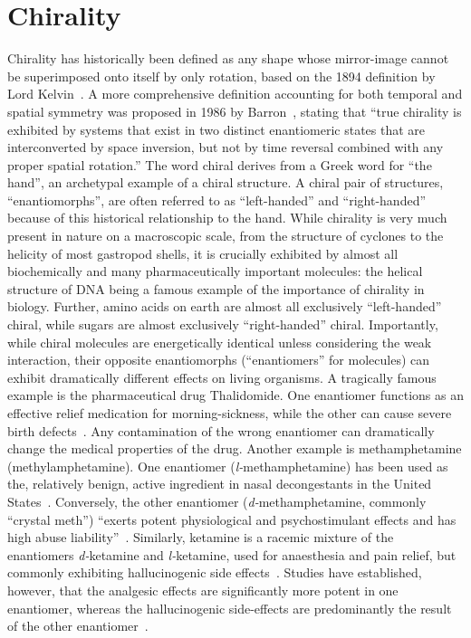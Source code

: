 \chapter{Chirality}\label{sec:background:Chirality}

Chirality has historically been defined as any shape whose mirror-image cannot be superimposed onto itself by only rotation, based on the 1894 definition by Lord Kelvin~\cite{Kelvin1894}. 
A more comprehensive definition accounting for both temporal and spatial symmetry was proposed in 1986 by Barron~\cite{Barron1986}, stating that ``true chirality is exhibited by systems that exist in two distinct enantiomeric states that are interconverted by space inversion, but not by time reversal combined with any proper spatial rotation.''
The word chiral derives from a Greek word for ``the hand'', an archetypal example of a chiral structure. A chiral pair of structures, ``enantiomorphs'', are often referred to as ``left-handed'' and ``right-handed'' because of this historical relationship to the hand. While chirality is very much present in nature on a macroscopic scale, from the structure of cyclones to the helicity of most gastropod shells, it is crucially exhibited by almost all biochemically and many pharmaceutically important molecules: the helical structure of DNA being a famous example of the importance of chirality in biology. Further, amino acids on earth are almost all exclusively ``left-handed'' chiral, while sugars are almost exclusively ``right-handed'' chiral. Importantly, while chiral molecules are energetically identical unless considering the weak interaction, their opposite enantiomorphs (``enantiomers'' for molecules) can exhibit dramatically different effects on living organisms. 
A tragically famous example is the pharmaceutical drug Thalidomide. One enantiomer functions as an effective relief medication for morning-sickness, while the other can cause severe birth defects~\cite{Vargesson2015}. Any contamination of the wrong enantiomer can dramatically change the medical properties of the drug.
Another example is methamphetamine (methylamphetamine). One enantiomer (\textit{l-}methamphetamine) has been used as the, relatively benign, active ingredient in nasal decongestants in the United States~\cite{Mendelson2008}. Conversely, the other enantiomer (\textit{d-}methamphetamine, commonly ``crystal meth'') ``exerts potent physiological and psychostimulant effects and has high abuse liability''~\cite{Nishimura2017}. 
Similarly, ketamine is a racemic mixture of the enantiomers \textit{d-}ketamine and \textit{l-}ketamine, used for anaesthesia and pain relief, but commonly exhibiting hallucinogenic side effects~\cite{Craven2007}. Studies have established, however, that the analgesic effects are significantly more potent in one enantiomer, whereas the hallucinogenic side-effects are predominantly the result of the other enantiomer~\cite{Craven2007, Muller2016, Zeilhofer1992}. 
